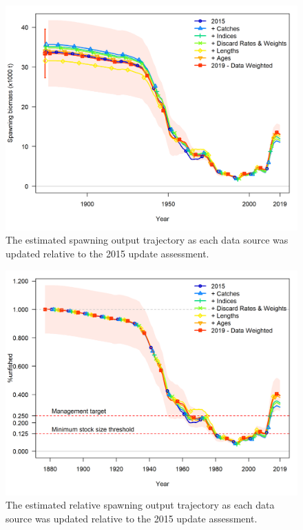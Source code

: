 \documentclass[12pt,]{article}
\begin{document}
\FloatBarrier

\begin{figure}
\centering
\includegraphics{Figures/data_ssb.png}
\caption{The estimated spawning output trajectory as each data source
was updated relative to the 2015 update assessment.
\label{fig:ssb_data}}
\end{figure}

\FloatBarrier

\begin{figure}
\centering
\includegraphics{Figures/data_depl.png}
\caption{The estimated relative spawning output trajectory as each data
source was updated relative to the 2015 update assessment.
\label{fig:depl_data}}
\end{figure}
\end{document}
